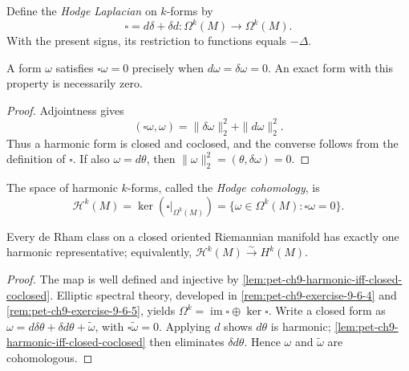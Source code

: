 \begin{definition}
  \label{def:pet-ch9-hodge-laplacian}
  Define the \emph{Hodge Laplacian} on $k$-forms by
  \[
    \square=d\delta+\delta d:\Omega^k(M)\longrightarrow\Omega^k(M).
  \]
  With the present signs, its restriction to functions equals $-\Delta$.
\end{definition}

\begin{lemma}
  \label{lem:pet-ch9-harmonic-iff-closed-coclosed}
  A form $\omega$ satisfies $\square\omega=0$ precisely when
  $d\omega=\delta\omega=0$.  An exact form with this property is necessarily
  zero.
\end{lemma}
\begin{proof}
  \sketch
  Adjointness gives
  \[
    (\square\omega,\omega)=\|\delta\omega\|_2^2+\|d\omega\|_2^2.
  \]
  Thus a harmonic form is closed and coclosed, and the converse follows from
  the definition of \(\square\).  If also \(\omega=d\theta\), then
  \(\|\omega\|_2^2=(\theta,\delta\omega)=0\).
\end{proof}

\begin{definition}
  \label{def:pet-ch9-hodge-cohomology}
  The space of harmonic $k$-forms, called the \emph{Hodge cohomology}, is
  \[
    \mathcal H^k(M)=\ker(\square|_{\Omega^k(M)})
      =\{\omega\in\Omega^k(M):\square\omega=0\}.
  \]
\end{definition}

\begin{theorem}
  \label{thm:pet-ch9-hodge-theorem}
  Every de Rham class on a closed oriented Riemannian manifold has exactly one
  harmonic representative; equivalently,
  $\mathcal H^k(M)\xrightarrow{\sim}H^k(M)$.
\end{theorem}
\begin{proof}
  \sketch
  The map is well defined and injective by
  \cref{lem:pet-ch9-harmonic-iff-closed-coclosed}.  Elliptic spectral theory,
  developed in \cref{rem:pet-ch9-exercise-9-6-4} and
  \cref{rem:pet-ch9-exercise-9-6-5}, yields
  \(\Omega^k=\operatorname{im}\square\oplus\ker\square\).  Write a closed form as
  \(\omega=d\delta\theta+\delta d\theta+\widetilde\omega\), with
  \(\square\widetilde\omega=0\).  Applying \(d\) shows \(d\theta\) is harmonic;
  \cref{lem:pet-ch9-harmonic-iff-closed-coclosed} then eliminates
  \(\delta d\theta\).  Hence \(\omega\) and \(\widetilde\omega\) are cohomologous.
\end{proof}

